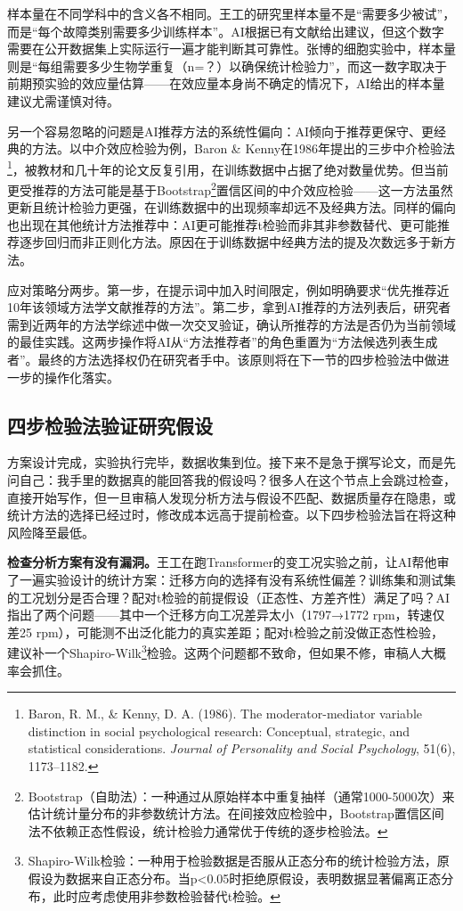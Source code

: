 样本量在不同学科中的含义各不相同。王工的研究里样本量不是``需要多少被试''，而是``每个故障类别需要多少训练样本''。AI根据已有文献给出建议，但这个数字需要在公开数据集上实际运行一遍才能判断其可靠性。张博的细胞实验中，样本量则是``每组需要多少生物学重复（n=？）以确保统计检验力''，而这一数字取决于前期预实验的效应量估算——在效应量本身尚不确定的情况下，AI给出的样本量建议尤需谨慎对待。

另一个容易忽略的问题是AI推荐方法的系统性偏向：AI倾向于推荐更保守、更经典的方法。以中介效应检验为例，Baron \& Kenny在1986年提出的三步中介检验法\footnote{Baron, R. M., \& Kenny, D. A. (1986). The moderator-mediator variable distinction in social psychological research: Conceptual, strategic, and statistical considerations. \textit{Journal of Personality and Social Psychology}, 51(6), 1173--1182.}，被教材和几十年的论文反复引用，在训练数据中占据了绝对数量优势。但当前更受推荐的方法可能是基于Bootstrap\footnote{Bootstrap（自助法）：一种通过从原始样本中重复抽样（通常1000-5000次）来估计统计量分布的非参数统计方法。在间接效应检验中，Bootstrap置信区间法不依赖正态性假设，统计检验力通常优于传统的逐步检验法。}置信区间的中介效应检验——这一方法虽然更新且统计检验力更强，在训练数据中的出现频率却远不及经典方法。同样的偏向也出现在其他统计方法推荐中：AI更可能推荐t检验而非其非参数替代、更可能推荐逐步回归而非正则化方法。原因在于训练数据中经典方法的提及次数远多于新方法。

应对策略分两步。第一步，在提示词中加入时间限定，例如明确要求``优先推荐近10年该领域方法学文献推荐的方法''。第二步，拿到AI推荐的方法列表后，研究者需到近两年的方法学综述中做一次交叉验证，确认所推荐的方法是否仍为当前领域的最佳实践。这两步操作将AI从``方法推荐者''的角色重置为``方法候选列表生成者''。最终的方法选择权仍在研究者手中。该原则将在下一节的四步检验法中做进一步的操作化落实。


\subsection{四步检验法验证研究假设}

方案设计完成，实验执行完毕，数据收集到位。接下来不是急于撰写论文，而是先问自己：我手里的数据真的能回答我的假设吗？很多人在这个节点上会跳过检查，直接开始写作，但一旦审稿人发现分析方法与假设不匹配、数据质量存在隐患，或统计方法的选择已经过时，修改成本远高于提前检查。以下四步检验法旨在将这种风险降至最低。

\textbf{检查分析方案有没有漏洞。}王工在跑Transformer的变工况实验之前，让AI帮他审了一遍实验设计的统计方案：迁移方向的选择有没有系统性偏差？训练集和测试集的工况划分是否合理？配对t检验的前提假设（正态性、方差齐性）满足了吗？AI指出了两个问题——其中一个迁移方向工况差异太小（1797→1772 rpm，转速仅差25 rpm），可能测不出泛化能力的真实差距；配对t检验之前没做正态性检验，建议补一个Shapiro-Wilk\footnote{Shapiro-Wilk检验：一种用于检验数据是否服从正态分布的统计检验方法，原假设为数据来自正态分布。当p<0.05时拒绝原假设，表明数据显著偏离正态分布，此时应考虑使用非参数检验替代t检验。}检验。这两个问题都不致命，但如果不修，审稿人大概率会抓住。

